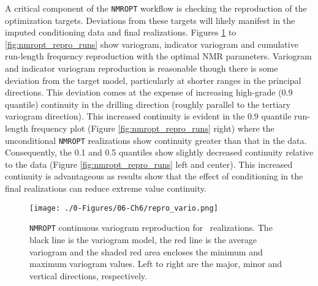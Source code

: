 A critical component of the \texttt{NMROPT} workflow is checking the reproduction of the optimization targets. Deviations from these targets will likely manifest in the imputed conditioning data and final realizations. Figures \ref{fig:nmropt_repro_vario} to \ref{fig:nmropt_repro_runs} show variogram, indicator variogram and cumulative run-length frequency reproduction with the optimal \gls{NMR} parameters. Variogram and indicator variogram reproduction is reasonable though there is some deviation from the target model, particularly at shorter ranges in the principal directions. This deviation comes at the expense of increasing high-grade (0.9 quantile) continuity in the drilling direction (roughly parallel to the tertiary variogram direction). This increased continuity is evident in the 0.9 quantile run-length frequency plot (Figure \ref{fig:nmropt_repro_runs} right) where the unconditional \texttt{NMROPT} realizations show continuity greater than that in the data. Consequently, the 0.1 and 0.5 quantiles show slightly decreased continuity relative to the data (Figure \ref{fig:nmropt_repro_runs} left and center). This increased continuity is advantageous as results show that the effect of conditioning in the final realizations can reduce extreme value continuity.

\begin{figure}[htb!]
    \centering
    \texttt{[image: ./0-Figures/06-Ch6/repro\_vario.png]}
    \caption{\texttt{NMROPT} continuous variogram reproduction for \csnreals \ realizations. The black line is the variogram model, the red line is the average variogram and the shaded red area encloses the minimum and maximum variogram values. Left to right are the major, minor and vertical directions, respectively.}
    \label{fig:nmropt_repro_vario}
\end{figure}

